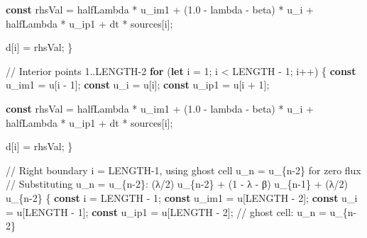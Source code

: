 \documentclass[
  letterpaper,
  DIV=11,
  numbers=noendperiod]{scrreprt}
\newenvironment{Shaded}{\begin{snugshade}}{\end{snugshade}}
\newcommand{\CommentTok}[1]{\textcolor[rgb]{0.37,0.37,0.37}{#1}}
\newcommand{\ControlFlowTok}[1]{\textcolor[rgb]{0.00,0.23,0.31}{\textbf{#1}}}
\newcommand{\DecValTok}[1]{\textcolor[rgb]{0.68,0.00,0.00}{#1}}
\newcommand{\FloatTok}[1]{\textcolor[rgb]{0.68,0.00,0.00}{#1}}
\newcommand{\KeywordTok}[1]{\textcolor[rgb]{0.00,0.23,0.31}{\textbf{#1}}}
\newcommand{\NormalTok}[1]{\textcolor[rgb]{0.00,0.23,0.31}{#1}}
\newcommand{\OperatorTok}[1]{\textcolor[rgb]{0.37,0.37,0.37}{#1}}
\begin{document}
\begin{Shaded}
\begin{Highlighting}[]
            \KeywordTok{const}\NormalTok{ rhsVal }\OperatorTok{=}
\NormalTok{                halfLambda }\OperatorTok{*}\NormalTok{ u\_im1 }\OperatorTok{+}
\NormalTok{                (}\FloatTok{1.0} \OperatorTok{{-}}\NormalTok{ lambda }\OperatorTok{{-}}\NormalTok{ beta) }\OperatorTok{*}\NormalTok{ u\_i }\OperatorTok{+}
\NormalTok{                halfLambda }\OperatorTok{*}\NormalTok{ u\_ip1 }\OperatorTok{+}
\NormalTok{                dt }\OperatorTok{*}\NormalTok{ sources[i]}\OperatorTok{;}

\NormalTok{            d[i] }\OperatorTok{=}\NormalTok{ rhsVal}\OperatorTok{;}
\NormalTok{        \}}

        \CommentTok{// Interior points 1..LENGTH{-}2}
        \ControlFlowTok{for}\NormalTok{ (}\KeywordTok{let}\NormalTok{ i }\OperatorTok{=} \DecValTok{1}\OperatorTok{;}\NormalTok{ i }\OperatorTok{\textless{}}\NormalTok{ LENGTH }\OperatorTok{{-}} \DecValTok{1}\OperatorTok{;}\NormalTok{ i}\OperatorTok{++}\NormalTok{) \{}
            \KeywordTok{const}\NormalTok{ u\_im1 }\OperatorTok{=}\NormalTok{ u[i }\OperatorTok{{-}} \DecValTok{1}\NormalTok{]}\OperatorTok{;}
            \KeywordTok{const}\NormalTok{ u\_i   }\OperatorTok{=}\NormalTok{ u[i]}\OperatorTok{;}
            \KeywordTok{const}\NormalTok{ u\_ip1 }\OperatorTok{=}\NormalTok{ u[i }\OperatorTok{+} \DecValTok{1}\NormalTok{]}\OperatorTok{;}

            \KeywordTok{const}\NormalTok{ rhsVal }\OperatorTok{=}
\NormalTok{                halfLambda }\OperatorTok{*}\NormalTok{ u\_im1 }\OperatorTok{+}
\NormalTok{                (}\FloatTok{1.0} \OperatorTok{{-}}\NormalTok{ lambda }\OperatorTok{{-}}\NormalTok{ beta) }\OperatorTok{*}\NormalTok{ u\_i }\OperatorTok{+}
\NormalTok{                halfLambda }\OperatorTok{*}\NormalTok{ u\_ip1 }\OperatorTok{+}
\NormalTok{                dt }\OperatorTok{*}\NormalTok{ sources[i]}\OperatorTok{;}

\NormalTok{            d[i] }\OperatorTok{=}\NormalTok{ rhsVal}\OperatorTok{;}
\NormalTok{        \}}

        \CommentTok{// Right boundary i = LENGTH{-}1, using ghost cell u\_n = u\_\{n{-}2\} for zero flux}
        \CommentTok{// Substituting u\_n = u\_\{n{-}2\}: (λ/2) u\_\{n{-}2\} + (1 {-} λ {-} β) u\_\{n{-}1\} + (λ/2) u\_\{n{-}2\}}
\NormalTok{        \{}
            \KeywordTok{const}\NormalTok{ i }\OperatorTok{=}\NormalTok{ LENGTH }\OperatorTok{{-}} \DecValTok{1}\OperatorTok{;}
            \KeywordTok{const}\NormalTok{ u\_im1 }\OperatorTok{=}\NormalTok{ u[LENGTH }\OperatorTok{{-}} \DecValTok{2}\NormalTok{]}\OperatorTok{;}
            \KeywordTok{const}\NormalTok{ u\_i   }\OperatorTok{=}\NormalTok{ u[LENGTH }\OperatorTok{{-}} \DecValTok{1}\NormalTok{]}\OperatorTok{;}
            \KeywordTok{const}\NormalTok{ u\_ip1 }\OperatorTok{=}\NormalTok{ u[LENGTH }\OperatorTok{{-}} \DecValTok{2}\NormalTok{]}\OperatorTok{;}   \CommentTok{// ghost cell: u\_n = u\_\{n{-}2\}}


\end{Highlighting}
\end{Shaded}
\end{document}
